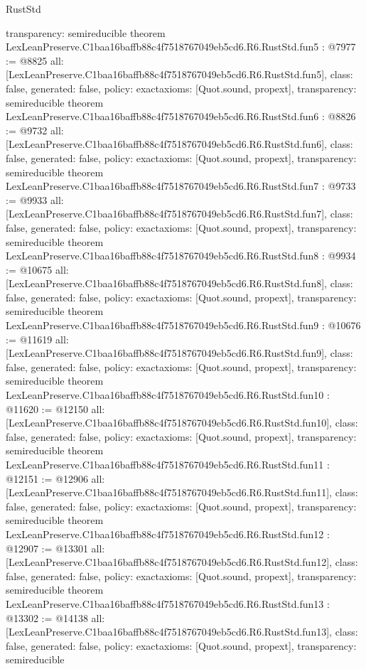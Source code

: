 \begin{lexlean}{RustStd}
\begin{coremodule}
{  transparency: semireducible
}
theorem LexLeanPreserve.C1baa16baffb88c4f7518767049eb5cd6.R6.RustStd.fun5 : @7977 := @8825 {
  all: [LexLeanPreserve.C1baa16baffb88c4f7518767049eb5cd6.R6.RustStd.fun5],
  class: false,
  generated: false,
  policy: exact{axioms: [Quot.sound, propext]},
  transparency: semireducible
}
theorem LexLeanPreserve.C1baa16baffb88c4f7518767049eb5cd6.R6.RustStd.fun6 : @8826 := @9732 {
  all: [LexLeanPreserve.C1baa16baffb88c4f7518767049eb5cd6.R6.RustStd.fun6],
  class: false,
  generated: false,
  policy: exact{axioms: [Quot.sound, propext]},
  transparency: semireducible
}
theorem LexLeanPreserve.C1baa16baffb88c4f7518767049eb5cd6.R6.RustStd.fun7 : @9733 := @9933 {
  all: [LexLeanPreserve.C1baa16baffb88c4f7518767049eb5cd6.R6.RustStd.fun7],
  class: false,
  generated: false,
  policy: exact{axioms: [Quot.sound, propext]},
  transparency: semireducible
}
theorem LexLeanPreserve.C1baa16baffb88c4f7518767049eb5cd6.R6.RustStd.fun8 : @9934 := @10675 {
  all: [LexLeanPreserve.C1baa16baffb88c4f7518767049eb5cd6.R6.RustStd.fun8],
  class: false,
  generated: false,
  policy: exact{axioms: [Quot.sound, propext]},
  transparency: semireducible
}
theorem LexLeanPreserve.C1baa16baffb88c4f7518767049eb5cd6.R6.RustStd.fun9 : @10676 := @11619 {
  all: [LexLeanPreserve.C1baa16baffb88c4f7518767049eb5cd6.R6.RustStd.fun9],
  class: false,
  generated: false,
  policy: exact{axioms: [Quot.sound, propext]},
  transparency: semireducible
}
theorem LexLeanPreserve.C1baa16baffb88c4f7518767049eb5cd6.R6.RustStd.fun10 : @11620 := @12150 {
  all: [LexLeanPreserve.C1baa16baffb88c4f7518767049eb5cd6.R6.RustStd.fun10],
  class: false,
  generated: false,
  policy: exact{axioms: [Quot.sound, propext]},
  transparency: semireducible
}
theorem LexLeanPreserve.C1baa16baffb88c4f7518767049eb5cd6.R6.RustStd.fun11 : @12151 := @12906 {
  all: [LexLeanPreserve.C1baa16baffb88c4f7518767049eb5cd6.R6.RustStd.fun11],
  class: false,
  generated: false,
  policy: exact{axioms: [Quot.sound, propext]},
  transparency: semireducible
}
theorem LexLeanPreserve.C1baa16baffb88c4f7518767049eb5cd6.R6.RustStd.fun12 : @12907 := @13301 {
  all: [LexLeanPreserve.C1baa16baffb88c4f7518767049eb5cd6.R6.RustStd.fun12],
  class: false,
  generated: false,
  policy: exact{axioms: [Quot.sound, propext]},
  transparency: semireducible
}
theorem LexLeanPreserve.C1baa16baffb88c4f7518767049eb5cd6.R6.RustStd.fun13 : @13302 := @14138 {
  all: [LexLeanPreserve.C1baa16baffb88c4f7518767049eb5cd6.R6.RustStd.fun13],
  class: false,
  generated: false,
  policy: exact{axioms: [Quot.sound, propext]},
  transparency: semireducible
}
\end{coremodule}
\end{lexlean}
